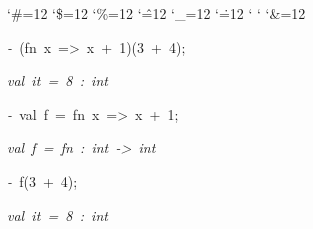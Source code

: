 \begin{list}{}
{\setlength{\leftmargin}{\leftmargini}
\setlength{\rightmargin}{0cm}
\setlength{\itemindent}{0cm}
\setlength{\listparindent}{0cm}
\setlength{\itemsep}{0cm}
\setlength{\parsep}{0cm}
\setlength{\labelsep}{0cm}
\setlength{\labelwidth}{0cm}
\catcode`\#=12
\catcode`\$=12
\catcode`\%=12
\catcode`\^=12
\catcode`\_=12
\catcode`\.=12
\catcode`
\catcode`
\catcode`\&=12
\ttfamily}
\small
\item[]\textsl{-\ }(fn\ x\ =>\ x\ +\ 1)(3\ +\ 4);
\item[]\textsl{val\ it\ =\ 8\ :\ int}
\item[]\textsl{-\ }val\ f\ =\ fn\ x\ =>\ x\ +\ 1;
\item[]\textsl{val\ f\ =\ fn\ :\ int\ ->\ int}
\item[]\textsl{-\ }f(3\ +\ 4);
\item[]\textsl{val\ it\ =\ 8\ :\ int}
\end{list}
